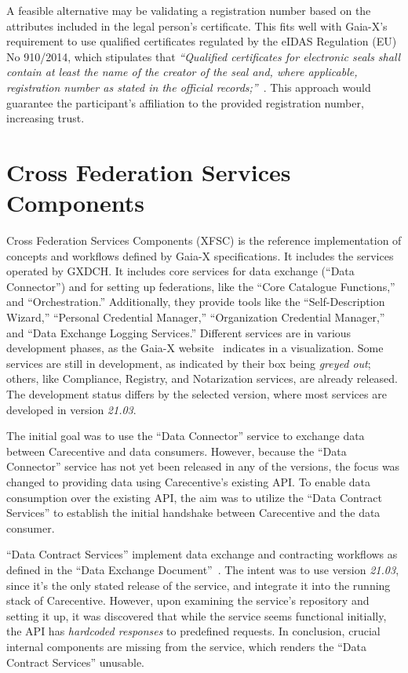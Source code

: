 A feasible alternative may be validating a registration number based on the attributes included in the legal person's certificate.
This fits well with Gaia-X's requirement to use qualified certificates regulated by the eIDAS Regulation (EU) No 910/2014, which stipulates that \textit{``Qualified certificates for electronic seals shall contain at least the name of the creator of the seal and, where applicable, registration number as stated in the official records;''}~\cite{eidas}.
This approach would guarantee the participant's affiliation to the provided registration number, increasing trust.

\section{Cross Federation Services Components}\label{sec:cross-federation-services-components}

Cross Federation Services Components (XFSC) is the reference implementation of concepts and workflows defined by Gaia-X specifications.
It includes the services operated by GXDCH.
It includes core services for data exchange (``Data Connector'') and for setting up federations, like the ``Core Catalogue Functions,'' and ``Orchestration.''
Additionally, they provide tools like the ``Self-Description Wizard,'' ``Personal Credential Manager,'' ``Organization Credential Manager,'' and ``Data Exchange Logging Services.''
Different services are in various development phases, as the Gaia-X website~\cite{gaiax} indicates in a visualization.
Some services are still in development, as indicated by their box being \textit{greyed out}; others, like Compliance, Registry, and Notarization services, are already released.
The development status differs by the selected version, where most services are developed in version \textit{21.03}.

The initial goal was to use the ``Data Connector'' service to exchange data between Carecentive and data consumers.
However, because the ``Data Connector'' service has not yet been released in any of the versions, the focus was changed to providing data using Carecentive's existing API.
To enable data consumption over the existing API, the aim was to utilize the ``Data Contract Services'' to establish the initial handshake between Carecentive and the data consumer.

``Data Contract Services'' implement data exchange and contracting workflows as defined in the ``Data Exchange Document''~\cite{gaiax_data_exchange_document}.
The intent was to use version \textit{21.03}, since it's the only stated release of the service, and integrate it into the running stack of Carecentive.
However, upon examining the service's repository and setting it up, it was discovered that while the service seems functional initially, the API has \textit{hardcoded responses} to predefined requests.
In conclusion, crucial internal components are missing from the service, which renders the ``Data Contract Services'' unusable.

